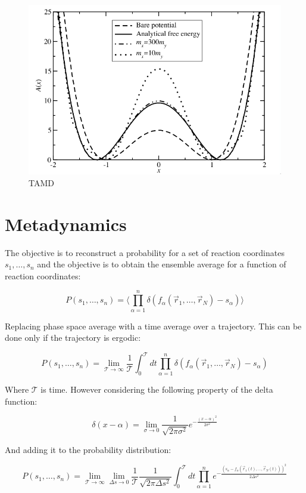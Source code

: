 	\begin{figure}[H]
		\includegraphics[width=\textwidth]{tamd}
		\caption{TAMD}
		\label{fig:tamd}
	\end{figure}

\section{Metadynamics}
The objective is to reconstruct a probability for a set of reaction coordinates $s_1, \dots, s_n$ and the objective is to obtain the ensemble average for a function of reaction coordinates:

$$P(s_1, \dots, s_n) = \biggl\langle\prod\limits_{\alpha=1}^n\delta(f_\alpha(\vec{r}_1, \dots, \vec{r}_N)-s_\alpha)\biggr\rangle$$

Replacing phase space average with a time average over a trajectory.
This can be done only if the trajectory is ergodic:

$$P(s_1, \dots, s_n) = \lim\limits_{\mathcal{T}\rightarrow\infty}\frac{1}{\mathcal{T}}\int_0^{\mathcal{T}} dt\prod\limits_{\alpha=1}^n\delta(f_\alpha(\vec{r}_1, \dots, \vec{r}_N)-s_\alpha)$$

Where $\mathcal{T}$ is time.
However considering the following property of the delta function:

$$\delta(x-\alpha) = \lim\limits_{\sigma\rightarrow 0}\frac{1}{\sqrt{2\pi\sigma^2}}e^{-\frac{(x-\alpha)^2}{2\sigma^2}}$$

And adding it to the probability distribution:

$$P(s_1, \dots, s_n) = \lim\limits_{\mathcal{T}\rightarrow\infty}\lim\limits_{\Delta s\rightarrow 0}\frac{1}{\mathcal{T}}\frac{1}{\sqrt{2\pi\Delta s^2}}\int_0^{\mathcal{T}}dt\prod\limits_{\alpha=1}^ne^{-\frac{(s_\alpha-f_\alpha(\vec{r}_1(t), \dots, \vec{r}_N(t)))^2}{2\Delta s^2}}$$

